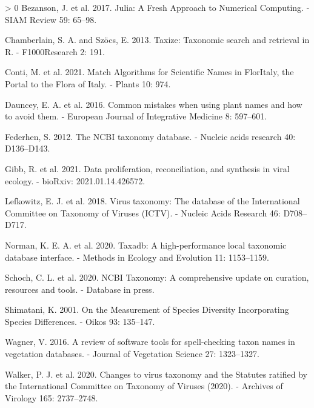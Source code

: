 \documentclass[10pt,oneside]{article}
\newlength{\cslhangindent}
\newenvironment{CSLReferences}[3] %
 {%
  \setlength{\parindent}{0pt}
  \ifodd #1 \everypar{\setlength{\hangindent}{\cslhangindent}}\ignorespaces\fi
  \ifnum #2 > 0
  \setlength{\parskip}{#2\baselineskip}
  \fi
 }%
 {}
\begin{document}
\hypertarget{refs}{}
\begin{CSLReferences}{1}{0}
\leavevmode\hypertarget{ref-Bezanson2017JulFre}{}%
Bezanson, J. et al. 2017. Julia: A Fresh Approach to Numerical
Computing. - SIAM Review 59: 65--98.

\leavevmode\hypertarget{ref-Chamberlain2013TaxTax}{}%
Chamberlain, S. A. and Szöcs, E. 2013. Taxize: Taxonomic search and
retrieval in R. - F1000Research 2: 191.

\leavevmode\hypertarget{ref-Conti2021MatAlg}{}%
Conti, M. et al. 2021. Match Algorithms for Scientific Names in
FlorItaly, the Portal to the Flora of Italy. - Plants 10: 974.

\leavevmode\hypertarget{ref-Dauncey2016ComMis}{}%
Dauncey, E. A. et al. 2016. Common mistakes when using plant names and
how to avoid them. - European Journal of Integrative Medicine 8:
597--601.

\leavevmode\hypertarget{ref-Federhen2012NcbTax}{}%
Federhen, S. 2012. The NCBI taxonomy database. - Nucleic acids research
40: D136--D143.

\leavevmode\hypertarget{ref-Gibb2021DatPro}{}%
Gibb, R. et al. 2021. Data proliferation, reconciliation, and synthesis
in viral ecology. - bioRxiv: 2021.01.14.426572.

\leavevmode\hypertarget{ref-Lefkowitz2018VirTax}{}%
Lefkowitz, E. J. et al. 2018. Virus taxonomy: The database of the
International Committee on Taxonomy of Viruses (ICTV). - Nucleic Acids
Research 46: D708--D717.

\leavevmode\hypertarget{ref-Norman2020TaxHig}{}%
Norman, K. E. A. et al. 2020. Taxadb: A high-performance local taxonomic
database interface. - Methods in Ecology and Evolution 11: 1153--1159.

\leavevmode\hypertarget{ref-Schoch2020NcbTax}{}%
Schoch, C. L. et al. 2020. NCBI Taxonomy: A comprehensive update on
curation, resources and tools. - Database in press.

\leavevmode\hypertarget{ref-Shimatani2001MeaSpe}{}%
Shimatani, K. 2001. On the Measurement of Species Diversity
Incorporating Species Differences. - Oikos 93: 135--147.

\leavevmode\hypertarget{ref-Wagner2016RevSof}{}%
Wagner, V. 2016. A review of software tools for spell-checking taxon
names in vegetation databases. - Journal of Vegetation Science 27:
1323--1327.

\leavevmode\hypertarget{ref-Walker2020ChaVir}{}%
Walker, P. J. et al. 2020. Changes to virus taxonomy and the Statutes
ratified by the International Committee on Taxonomy of Viruses (2020). -
Archives of Virology 165: 2737--2748.

\end{CSLReferences}
\end{document}
